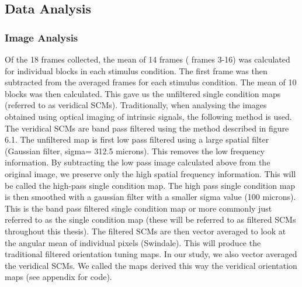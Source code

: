 			
	\subsection{Data Analysis}
		\subsubsection{Image Analysis}

			Of the 18 frames collected, the mean of 14 frames ( frames 3-16) was calculated for individual blocks in each stimulus condition. The first frame was then subtracted from the averaged frames for each stimulus condition. The mean of 10 blocks was then calculated. This gave us the unfiltered single condition maps (referred to as veridical SCMs). Traditionally, when analysing the images obtained using optical imaging of intrinsic signals, the following method is used. The veridical SCMs are band pass filtered using the method described in figure 6.1. The unfiltered map is first low pass filtered using a large spatial filter (Gaussian filter, sigma= 312.5 microns). This removes the low frequency information. By subtracting the low pass image calculated above from the original image, we preserve only the high spatial frequency information. This will be called the high-pass single condition map. The high pass single condition map is then smoothed with a gaussian filter with a smaller sigma value (100 microns). This is the band pass filtered single condition map or more commonly just referred to as the single condition map (these will be referred to as filtered SCMs throughout this thesis). The filtered SCMs are then vector averaged to look at the angular mean of individual pixels (Swindale). This will produce the traditional filtered orientation tuning maps. In our study, we also vector averaged the veridical SCMs. We called the maps derived this way the veridical orientation maps (see appendix for code).
			
